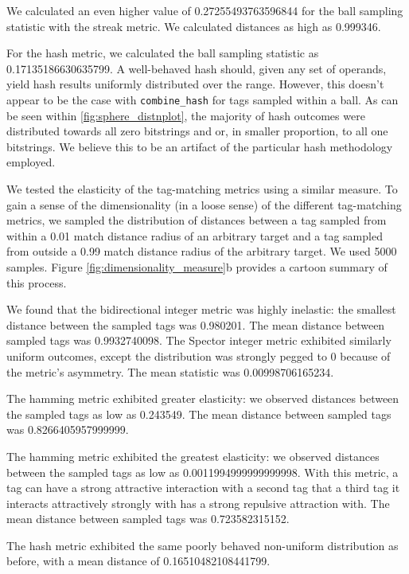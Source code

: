 We calculated an even higher value of 0.27255493763596844 for the ball sampling statistic with the streak metric.
We calculated distances as high as 0.999346.

For the hash metric, we calculated the ball sampling statistic as 0.17135186630635799.
A well-behaved hash should, given any set of operands, yield hash results uniformly distributed over the range.
However, this doesn't appear to be the case with \texttt{combine\_hash} for tags sampled within a ball.
As can be seen within \ref{fig:sphere_distnplot}, the majority of hash outcomes were distributed towards all zero bitstrings and or, in smaller proportion, to all one bitstrings.
We believe this to be an artifact of the particular hash methodology employed.



We tested the elasticity of the tag-matching metrics using a similar measure.
To gain a sense of the dimensionality (in a loose sense) of the different tag-matching metrics, we sampled the distribution of distances between a tag sampled from within a 0.01 match distance radius of an arbitrary target and a tag sampled from outside a 0.99 match distance radius of the arbitrary target.
We used 5000 samples.
Figure \ref{fig:dimensionality_measure}b provides a cartoon summary of this process.

We found that the bidirectional integer metric was highly inelastic: the smallest distance between the sampled tags was 0.980201.
The mean distance between sampled tags was 0.9932740098.
The Spector integer metric exhibited similarly uniform outcomes, except the distribution was strongly pegged to 0 because of the metric's asymmetry.
The mean statistic was 0.00998706165234.

The hamming metric exhibited greater elasticity: we observed distances between the sampled tags as low as 0.243549.
The mean distance between sampled tags was 0.8266405957999999.

The hamming metric exhibited the greatest elasticity: we observed distances between the sampled tags as low as 0.0011994999999999998.
With this metric, a tag can have a strong attractive interaction with a second tag that a third tag it interacts attractively strongly with has a strong repulsive attraction with.
The mean distance between sampled tags was 0.723582315152.

The hash metric exhibited the same poorly behaved non-uniform distribution as before, with a mean distance of 0.16510482108441799.

